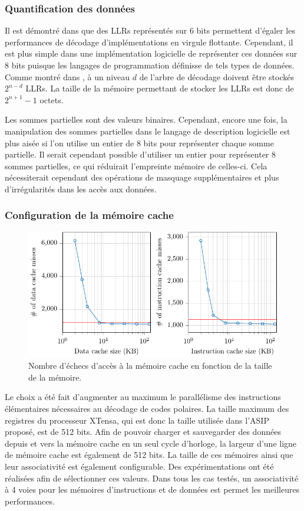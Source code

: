 \subsubsection{Quantification des données}
Il est démontré dans \cite{sarkis_fast_2014} que des LLRs représentés sur 6 bits permettent d'égaler les performances de décodage d'implémentations en virgule flottante. Cependant, il est plus simple dans une implémentation logicielle de représenter ces données sur 8 bits puisque les langages de programmation définisse de tels types de données. Comme montré dans \cite{leroux_hardware_2011}, à un niveau $d$ de l'arbre de décodage doivent être stockés $2^{n-d}$ LLRs. La taille de la mémoire permettant de stocker les LLRs est donc de $2^{n+1}-1$ octets.

Les sommes partielles sont des valeurs binaires. Cependant, encore une fois, la manipulation des sommes partielles dans le langage de description logicielle est plus aisée si l'on utilise un entier de 8 bits pour représenter chaque somme partielle. Il serait cependant possible d'utiliser un entier pour représenter 8 sommes partielles, ce qui réduirait l'empreinte mémoire de celles-ci. Cela nécessiterait cependant des opérations de masquage supplémentaires et plus d'irrégularités dans les accès aux données.

\subsubsection{Configuration de la mémoire cache}
\begin{figure}
\centering
\includegraphics[width=\textwidth]{main/ch3_fig/curves/memory/tikz/memory}
\caption{Nombre d'échecs d'accès à la mémoire cache en fonction de la taille de la mémoire.}
\label{fig:tensilica_mem}
\end{figure}
Le choix a été fait d'augmenter au maximum le parallélisme des instructions élémentaires nécessaires au décodage de codes polaires. La taille maximum des registres du processeur XTensa, qui est donc la taille utilisée dans l'ASIP proposé, est de 512 bits. Afin de pouvoir charger et sauvegarder des données depuis et vers la mémoire cache en un seul cycle d'horloge, la largeur d'une ligne de mémoire cache est également de 512 bits. La taille de ces mémoires ainsi que leur associativité est également configurable. Des expérimentations ont été réalisées afin de sélectionner ces valeurs. Dans tous les cas testés, un associativité à 4 voies pour les mémoires d'instructions et de données est permet les meilleures performances.


